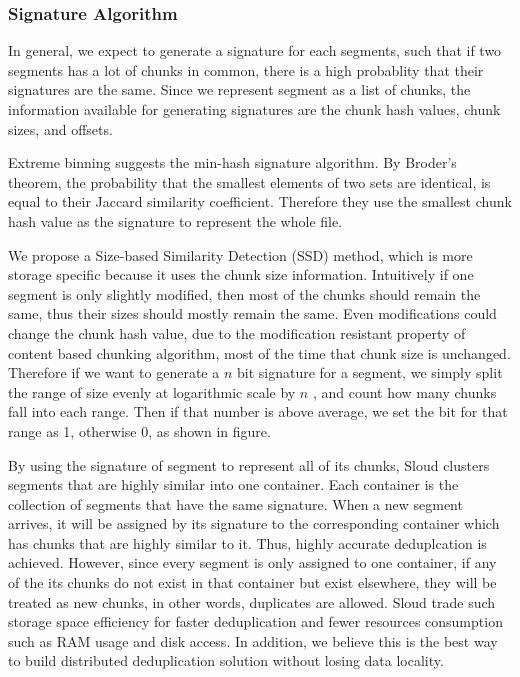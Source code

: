\subsubsection{Signature Algorithm}
In general, we expect to generate a signature for each segments, such that if two segments
has a lot of chunks in common, there is a high probablity that their signatures are the same.
Since we represent segment as a list of chunks, the information available for generating 
signatures are the chunk hash values, chunk sizes, and offsets. 

Extreme binning suggests the min-hash signature algorithm. By Broder's theorem, 
the probability that the smallest elements of two sets are identical, is equal to their Jaccard similarity coefficient.
Therefore they use the smallest chunk hash value as the signature to represent the whole file. 

We propose a Size-based Similarity Detection (SSD) method, 
which is more storage specific because it uses the chunk size information. Intuitively if one segment is
only slightly modified, then most of the chunks should remain the same, thus their sizes should mostly remain the same.
Even modifications could change the chunk hash value, due to the modification resistant property of 
content based chunking algorithm, most of the time that chunk size is unchanged. Therefore if we want to 
generate a $n$ bit signature for a segment, we simply split the range of size evenly at logarithmic scale by $n$ , and count how many chunks
fall into each range. Then if that number is above average, we set the bit for that range as 1, otherwise 0, as shown
in figure.

By using the signature of segment to represent all of its chunks, Sloud clusters
segments that are highly similar into one container. Each container is the collection of 
segments that have the same signature. When a new segment arrives, it will be assigned by its signature to
the corresponding container which has chunks that are highly similar to it. Thus,  highly accurate deduplcation is achieved.
However, since every segment is only assigned to one container, if any of the its chunks do not 
exist in that container but exist elsewhere, they will be treated as new chunks, in other words, 
duplicates are allowed. Sloud trade such storage space efficiency for faster deduplication and  
fewer resources consumption such as RAM usage and disk access. In addition, we believe this is the best way to 
build distributed deduplication solution without losing data locality.


